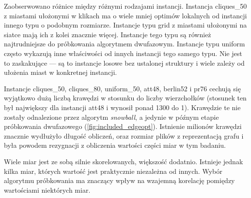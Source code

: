 Zaobserwowano różnice między różnymi rodzajami instancji.
Instancja cliques\_50 z miastami ułożonymi w klikach ma o wiele mniej optimów lokalnych od instancji innego typu o podobnym rozmiarze.
Instancje typu grid z miastami ułożonymi na siatce mają ich z kolei znacznie więcej.
Instancje tego typu są również najtrudniejsze do próbkowania algorytmem dwufazowym.
Instancje typu uniform często wykazują inne właściwości od innych instancji tego samego typu.
Nie jest to zaskakujące --- są to instancje losowe bez ustalonej struktury i wiele zależy od ułożenia miast w konkretnej instancji.

Instancje cliques\_50, cliques\_80, uniform\_50, att48, berlin52 i pr76 cechują się wyjątkowo dużą liczbą krawędzi
w stosunku do liczby wierzchołków (stosunek ten był największy dla instancji att48 i wynosił ponad 1300 do 1).
Krawędzie te nie zostały odnalezione przez algorytm \textit{snowball}, a jedynie w późnym etapie próbkowania dwufazowego (\ref{fig:included_edgeopt}).
Istnienie milionów krawędzi znacznie wydłużyło długość obliczeń, oraz rozmiar plików z reprezentacją grafu i była powodem rezygnacji z obliczenia
wartości części miar w tym badaniu.

Wiele miar jest ze sobą silnie skorelowanych, większość dodatnio.
Istnieje jednak kilka miar, których wartość jest praktycznie niezależna od innych.
Wybór algorytmu próbkowania ma znaczący wpływ na wzajemną korelację pomiędzy wartościami niektórych miar.

